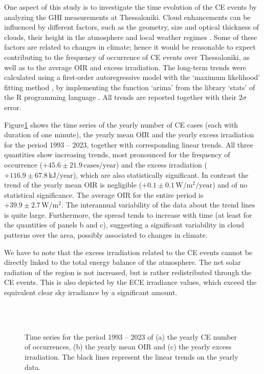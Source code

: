 \documentclass[preprint, 5p,
authoryear]{elsarticle} %
\begin{document}
One aspect of this study is to investigate the time evolution of the CE
events by analyzing the GHI measurements at Thessaloniki. Cloud
enhancements can be influenced by different factors, such as the
geometry, size and optical thickness of clouds, their height in the
atmosphere and local weather regimes
\citep{Mol2023, Veerman2022, Gristey2022, Tzoumanikas2016}. Some of
these factors are related to changes in climate; hence it would be
reasonable to expect contributing to the frequency of occurrence of CE
events over Thessaloniki, as well as to the average OIR and excess
irradiation. The long-term trends were calculated using a first-order
autoregressive model with the `maximum likelihood' fitting method
\citep{Gardner1980, Jones1980}, by implementing the function `arima'
from the library `stats' of the R programming language \citep{RCT2023}.
All trends are reported together with their \(2\sigma\) error.

Figure\nobreakspace{}\ref{fig:P-energy} shows the time series of the
yearly number of CE cases (each with duration of one minute), the yearly
mean OIR and the yearly excess irradiation for the period 1993 -- 2023,
together with corresponding linear trends. All three quantities show
increasing trends, most pronounced for the frequency of occurrence
(\(+45.6\pm 21.9\,\text{cases}/\text{year}\)) and the excess irradiation
(\(+116.9 \pm 67.8\,\text{kJ}/\text{year}\)), which are also
statistically significant. In contrast the trend of the yearly mean OIR
is negligible (\(+0.1\pm 0.1\,\text{W}/\text{m}^2/\text{year}\)) and of
no statistical significance. The average OIR for the entire period is
\(+39.9\pm 2.7\,\text{W}/\text{m}^2\). The interannual variability of
the data about the trend lines is quite large. Furthermore, the spread
tends to increase with time (at least for the quantities of panels b and
c), suggesting a significant variability in cloud patterns over the
area, possibly associated to changes in climate.

We have to note that the excess irradiation related to the CE events
cannot be directly linked to the total energy balance of the atmosphere.
The net solar radiation of the region is not increased, but is rather
redistributed through the CE events. This is also depicted by the ECE
irradiance values, which exceed the equivalent clear sky irradiance by a
significant amount.

\begin{figure}%
        {\centering 
            \\
            \\
        }
    \caption{Time series for the period 1993 -- 2023 of (a) the yearly CE number of occurrences, (b) the yearly mean OIR and (c) the yearly excess irradiation. The black lines represent the linear trends on the yearly data.}\label{fig:P-energy}
\end{figure}
\end{document}
